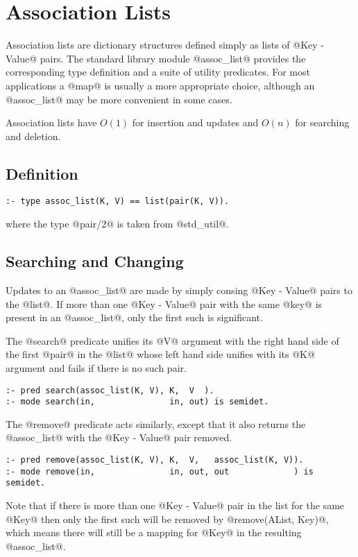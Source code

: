 
\chapter{Association Lists}

Association lists are dictionary structures defined simply as lists of
@Key - Value@ pairs.  The standard library module @assoc_list@ provides the
corresponding type definition and a suite of utility predicates.  For
most applications a @map@ is usually a more appropriate choice, although
an @assoc_list@ may be more convenient in some cases.

Association lists have $O(1)$ for insertion and updates and $O(n)$ for
searching and deletion.

\section{Definition}

\begin{verbatim}
:- type assoc_list(K, V) == list(pair(K, V)).
\end{verbatim}
where the type @pair/2@ is taken from @std_util@.

\section{Searching and Changing}

Updates to an @assoc_list@ are made by simply consing @Key - Value@
pairs to the @list@.  If more than one @Key - Value@ pair with the same
@key@ is present in an @assoc_list@, only the first such is significant.

The @search@ predicate unifies its @V@ argument with the right hand side
of the first @pair@ in the @list@ whose left hand side unifies with its
@K@ argument and fails if there is no such pair.
\begin{verbatim}
:- pred search(assoc_list(K, V), K,  V  ).
:- mode search(in,               in, out) is semidet.
\end{verbatim}

The @remove@ predicate acts similarly, except that it also returns the
@assoc_list@ with the @Key - Value@ pair removed.
\begin{verbatim}
:- pred remove(assoc_list(K, V), K,  V,   assoc_list(K, V)).
:- mode remove(in,               in, out, out             ) is semidet.
\end{verbatim}
Note that if there is more than one @Key - Value@ pair in the list for
the same @Key@ then only the first such will be removed by 
@remove(AList, Key)@, which means there will still be a mapping for
@Key@ in the resulting @assoc_list@.  

